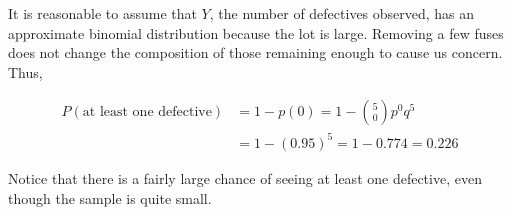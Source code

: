 \documentclass[11pt]{article}
\theoremstyle{definition}
\begin{document}
It is reasonable to assume that $Y$, the number of defectives observed, has an approximate binomial distribution because the lot is large. Removing a few fuses does not change the composition of those remaining enough to cause us concern. Thus,

$$
	\begin{aligned}
		P(\text{at least one defective}) & = 1 - p(0) = 1 - {5 \choose 0} p^0q^5 \\
		& = 1 - (0.95)^5 = 1 - 0.774 = 0.226
	\end{aligned}
$$

Notice that there is a fairly large chance of seeing at least one defective, even though the sample is quite small.
\end{document}
